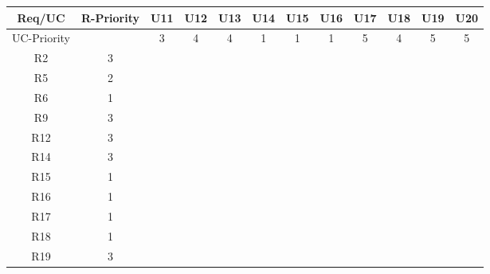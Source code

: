 \documentclass[12pt]{article}
\begin{document}
	\newpage
	\begin{longtable}{|c|c|c|c|c|c|c|c|c|c|c|c|}
		\hline
		Req/UC      & R-Priority & U11      & U12      & U13      & U14      & U15      & U16      & U17      & U18      & U19      & U20      \\
		\hline
		UC-Priority &            & 3         & 4         & 4         & 1         & 1         & 1         & 5         & 4         & 5         & 5         \\
		\hline
		R2          & 3          &           &           &           &           &           &           &           &           &           &           \\
		\hline
		R5          & 2          &           &           &           &           &           &           &           &           &           &           \\
		\hline
		R6          & 1          &           &           &           &           &           &           &           &           &           &           \\
		\hline
		R9          & 3          &           &           &           &           &           &           &           &           &           &           \\
		\hline
		R12         & 3          &           &           &           &           &           &           &           &           &           &           \\
		\hline
		R14         & 3          &           &           &           &           &           &           &           &           &           &           \\
		\hline
		R15         & 1          &           &           &           &           &           &           &           &           &           &           \\
		\hline
		R16         & 1          &           &           &           &           &           &           &           &           &           &           \\
		\hline
		R17         & 1          &           &           &           &           &           &           &           &           &           &           \\
		\hline
		R18         & 1          &           &           &           &           &           &           &           &           &           &           \\
		\hline
		R19         & 3          &           &           &           &           &           &           &           &           &           &           \\

\end{longtable}
\end{document}
